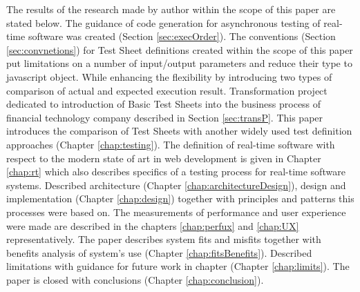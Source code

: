 The results of the research made by author within the scope of this paper are stated below.
The guidance of code generation for asynchronous testing of real-time software was created (Section \ref{sec:execOrder}). 
The conventions (Section \ref{sec:convnetions}) for Test Sheet definitions created within the scope of this paper put limitations on a number of input/output parameters and reduce their type to javascript object.
While enhancing the flexibility by introducing two types of comparison of actual and expected execution result. 
Transformation project dedicated to introduction of Basic Test Sheets into the business process of financial technology company described in Section \ref{sec:transP}.
This paper introduces the comparison of Test Sheets with another widely used test definition approaches (Chapter \ref{chap:testing}). 
The definition of real-time software with respect to the modern state of art in web development is given in Chapter \ref{chap:rt} which also describes specifics of a testing process for real-time software systems.
Described architecture (Chapter \ref{chap:architectureDesign}), design and implementation (Chapter \ref{chap:design}) together with principles and patterns this processes were based on. 
The measurements of performance and user experience were made are described in the chapters \ref{chap:perfux} and \ref{chap:UX} representatively. 
The paper describes system fits and misfits together with benefits analysis of system's use (Chapter \ref{chap:fitsBenefits}).
Described limitations with guidance for future work in chapter (Chapter \ref{chap:limits}). The paper is closed with conclusions (Chapter \ref{chap:conclusion}).



